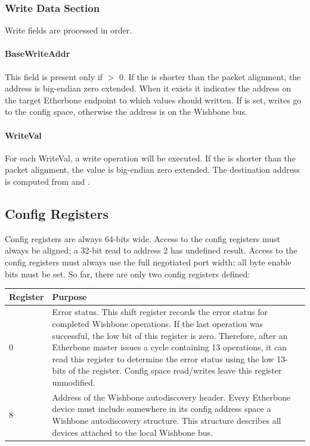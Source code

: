 \documentclass{article}
\begin{document}
\subsubsection{Write Data Section}

Write fields are processed in order.

\paragraph{BaseWriteAddr} \label{field:BaseWriteAddr}
This field is present only if  $>$ 0.
If the  is shorter than the packet alignment, 
the address is big-endian zero extended.
When it exists it indicates the address on the target Etherbone endpoint 
to which values should written.
If  is set,
writes go to the config space,
otherwise the address is on the Wishbone bus.

\paragraph{WriteVal} \label{field:WriteVal}
For each WriteVal, 
a write operation will be executed.
If the  is shorter than the packet alignment, 
the value is big-endian zero extended.
The destination address is computed from  and 
.


\subsection{Config Registers}
\label{sec:config}

Config registers are always 64-bits wide.
Access to the config registers must always be aligned;
a 32-bit read to address 2 has undefined result.
Access to the config registers must always use the full negotiated port width;
all byte enable bits must be set.
So far, there are only two config registers defined:

\begin{tabular}{|l|p{}|}
\hline
Register & Purpose \\
\hline
0 &
Error status.
This shift register records the error status for completed Wishbone
operations.
If the last operation was successful,
the low bit of this register is zero.
Therefore, 
after an Etherbone master issues a cycle containing 13 operations,
it can read this register to determine the error status using the low
13-bits of the register.
Config space read/writes leave this register unmodified.
\\
\hline
8 &
Address of the Wishbone autodiscovery header.
Every Etherbone device must include somewhere in its config address space
a Wishbone autodiscovery structure.
This structure describes all devices attached to the local Wishbone bus.
\\
\hline
\end{tabular}
\end{document}
